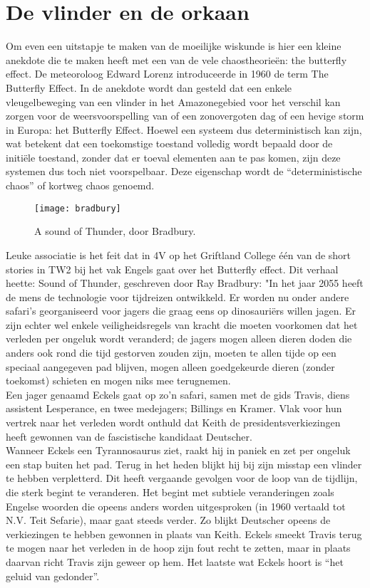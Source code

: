 \documentclass[11pt,fleqn]{book} %
\begin{document}
\section{De vlinder en de orkaan}
Om even een uitstapje te maken van de moeilijke wiskunde is hier een kleine anekdote die te maken heeft met een van de vele chaostheorieën: the butterfly effect.
De meteoroloog Edward Lorenz introduceerde in 1960 de term The Butterfly Effect. In de anekdote wordt dan gesteld dat een enkele vleugelbeweging van een vlinder in het Amazonegebied voor het verschil kan zorgen voor de weersvoorspelling van of een zonovergoten dag of een hevige storm in Europa: het Butterfly Effect. Hoewel een systeem dus deterministisch kan zijn, wat betekent dat een toekomstige toestand volledig wordt bepaald door de initiële toestand, zonder dat er toeval elementen aan te pas komen, zijn deze systemen dus toch niet voorspelbaar. Deze eigenschap wordt de “deterministische chaos” of kortweg chaos genoemd.
\begin{figure}[h]
	\centering\texttt{[image: bradbury]}
	\caption{A sound of Thunder, door Bradbury.}
	\label{fig:bradbury}
\end{figure}
Leuke associatie is het feit dat in 4V op het Griftland College één van de short stories in TW2 bij het vak Engels gaat over het Butterfly effect. Dit verhaal heette: Sound of Thunder, geschreven door Ray Bradbury:  "In het jaar 2055 heeft de mens de technologie voor tijdreizen ontwikkeld. Er worden nu onder andere safari’s georganiseerd voor jagers die graag eens op dinosauriërs willen jagen. Er zijn echter wel enkele veiligheidsregels van kracht die moeten voorkomen dat het verleden per ongeluk wordt veranderd; de jagers mogen alleen dieren doden die anders ook rond die tijd gestorven zouden zijn, moeten te allen tijde op een speciaal aangegeven pad blijven, mogen alleen goedgekeurde dieren (zonder toekomst) schieten en mogen niks mee terugnemen.\\
Een jager genaamd Eckels gaat op zo’n safari, samen met de gids Travis, diens assistent Lesperance, en twee medejagers; Billings en Kramer. Vlak voor hun vertrek naar het verleden wordt onthuld dat Keith de presidentsverkiezingen heeft gewonnen van de fascistische kandidaat Deutscher.\\
Wanneer Eckels een Tyrannosaurus ziet, raakt hij in paniek en zet per ongeluk een stap buiten het pad. Terug in het heden blijkt hij bij zijn misstap een vlinder te hebben verpletterd. Dit heeft vergaande gevolgen voor de loop van de tijdlijn, die sterk begint te veranderen. Het begint met subtiele veranderingen zoals Engelse woorden die opeens anders worden uitgesproken (in 1960 vertaald tot N.V. Teit Sefarie), maar gaat steeds verder. Zo blijkt Deutscher opeens de verkiezingen te hebben gewonnen in plaats van Keith. Eckels smeekt Travis terug te mogen naar het verleden in de hoop zijn fout recht te zetten, maar in plaats daarvan richt Travis zijn geweer op hem. Het laatste wat Eckels hoort is “het geluid van gedonder”.
\end{document}
